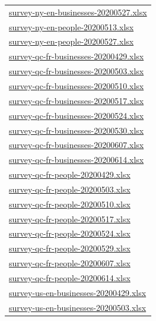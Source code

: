 \documentclass[
]{article}
\begin{document}
\begin{longtable}[]{@{}l@{}}
\href{final/survey-ny-en-businesses-20200527.xlsx}{survey-ny-en-businesses-20200527.xlsx} \\
\href{final/survey-ny-en-people-20200513.xlsx}{survey-ny-en-people-20200513.xlsx} \\
\href{final/survey-ny-en-people-20200527.xlsx}{survey-ny-en-people-20200527.xlsx} \\
\href{final/survey-qc-fr-businesses-20200429.xlsx}{survey-qc-fr-businesses-20200429.xlsx} \\
\href{final/survey-qc-fr-businesses-20200503.xlsx}{survey-qc-fr-businesses-20200503.xlsx} \\
\href{final/survey-qc-fr-businesses-20200510.xlsx}{survey-qc-fr-businesses-20200510.xlsx} \\
\href{final/survey-qc-fr-businesses-20200517.xlsx}{survey-qc-fr-businesses-20200517.xlsx} \\
\href{final/survey-qc-fr-businesses-20200524.xlsx}{survey-qc-fr-businesses-20200524.xlsx} \\
\href{final/survey-qc-fr-businesses-20200530.xlsx}{survey-qc-fr-businesses-20200530.xlsx} \\
\href{final/survey-qc-fr-businesses-20200607.xlsx}{survey-qc-fr-businesses-20200607.xlsx} \\
\href{final/survey-qc-fr-businesses-20200614.xlsx}{survey-qc-fr-businesses-20200614.xlsx} \\
\href{final/survey-qc-fr-people-20200429.xlsx}{survey-qc-fr-people-20200429.xlsx} \\
\href{final/survey-qc-fr-people-20200503.xlsx}{survey-qc-fr-people-20200503.xlsx} \\
\href{final/survey-qc-fr-people-20200510.xlsx}{survey-qc-fr-people-20200510.xlsx} \\
\href{final/survey-qc-fr-people-20200517.xlsx}{survey-qc-fr-people-20200517.xlsx} \\
\href{final/survey-qc-fr-people-20200524.xlsx}{survey-qc-fr-people-20200524.xlsx} \\
\href{final/survey-qc-fr-people-20200529.xlsx}{survey-qc-fr-people-20200529.xlsx} \\
\href{final/survey-qc-fr-people-20200607.xlsx}{survey-qc-fr-people-20200607.xlsx} \\
\href{final/survey-qc-fr-people-20200614.xlsx}{survey-qc-fr-people-20200614.xlsx} \\
\href{final/survey-us-en-businesses-20200429.xlsx}{survey-us-en-businesses-20200429.xlsx} \\
\href{final/survey-us-en-businesses-20200503.xlsx}{survey-us-en-businesses-20200503.xlsx} \\

\end{longtable}
\end{document}
